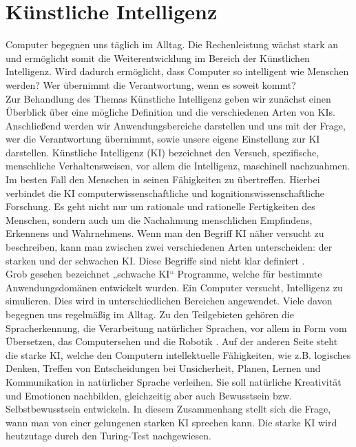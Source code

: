 \section{Künstliche Intelligenz}

Computer begegnen uns täglich im Alltag. Die Rechenleistung wächst stark an und ermöglicht somit die Weiterentwicklung im Bereich der Künstlichen Intelligenz. Wird dadurch ermöglicht, dass Computer so intelligent wie Menschen werden? Wer übernimmt die Verantwortung, wenn es soweit kommt?\\
%

Zur Behandlung des Themas Künstliche Intelligenz geben wir zunächst einen Überblick über eine mögliche Definition und die verschiedenen Arten von KIs.
Anschließend werden wir Anwendungsbereiche darstellen und uns mit der Frage, wer die Verantwortung übernimmt, sowie unsere eigene Einstellung zur KI darstellen.
Künstliche Intelligenz (KI) bezeichnet den Versuch, spezifische, menschliche Verhaltensweisen, vor allem die Intelligenz, maschinell nachzuahmen. Im besten Fall den Menschen in seinen Fähigkeiten zu übertreffen. Hierbei verbindet die KI computerwissenschaftliche und kognitionswissenschaftliche Forschung.
Es geht nicht nur um rationale und rationelle Fertigkeiten des Menschen, sondern auch um die Nachahmung menschlichen Empfindens, Erkennens und Wahrnehmens.
Wenn man den Begriff KI näher versucht zu beschreiben, kann man zwischen zwei verschiedenen Arten unterscheiden: der starken und der schwachen KI. Diese Begriffe sind nicht klar definiert \cite{UniversitaetOldenburg}. \\
%

Grob gesehen bezeichnet „schwache KI“ Programme, welche für bestimmte Anwendungsdomänen entwickelt wurden. Ein Computer versucht, Intelligenz zu simulieren. Dies wird in unterschiedlichen Bereichen angewendet. Viele davon begegnen uns regelmäßig im Alltag. Zu den Teilgebieten gehören die Spracherkennung, die Verarbeitung natürlicher Sprachen, vor allem in Form vom Übersetzen, das Computersehen und die Robotik \cite{UniversitaetJena} \cite{Spektrum_1}.
Auf der anderen Seite steht die starke KI, welche den Computern intellektuelle Fähigkeiten, wie z.B. logisches Denken, Treffen von Entscheidungen bei Unsicherheit, Planen, Lernen und Kommunikation in natürlicher Sprache verleihen. Sie soll natürliche Kreativität und Emotionen nachbilden, gleichzeitig aber auch Bewusstsein bzw. Selbstbewusstsein entwickeln. In diesem Zusammenhang stellt sich die Frage, wann man von einer gelungenen starken KI sprechen kann. Die starke KI wird heutzutage durch den Turing-Test nachgewiesen. \\
%

